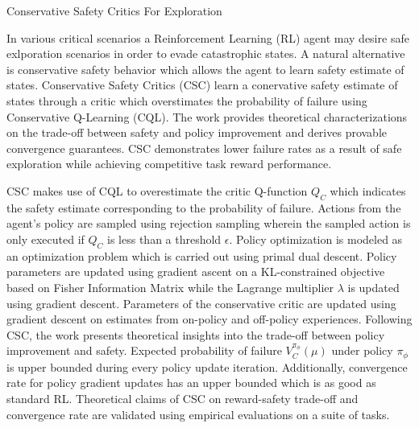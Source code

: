 \documentclass[11pt,letterpaper]{article}
\begin{document}
\begin{center}
  \large{Conservative Safety Critics For Exploration}
\end{center}

In various critical scenarios a Reinforcement Learning (RL) agent may desire safe exlporation scenarios in order to evade catastrophic states. A natural alternative is conservative safety behavior which allows the agent to learn safety estimate of states. Conservative Safety Critics (CSC) learn a conervative safety estimate of states through a critic which overstimates the probability of failure using Conservative Q-Learning (CQL). The work provides theoretical characterizations on the trade-off between safety and policy improvement and derives provable convergence guarantees. CSC demonstrates lower failure rates as a result of safe exploration while achieving competitive task reward performance. 

CSC makes use of CQL to overestimate the critic Q-function $Q_{C}$ which indicates the safety estimate corresponding to the probability of failure. Actions from the agent's policy are sampled using rejection sampling wherein the sampled action is only executed if $Q_{C}$ is less than a threshold $\epsilon$. Policy optimization is modeled as an optimization problem which is carried out using primal dual descent. Policy parameters are updated using gradient ascent on a KL-constrained objective based on Fisher Information Matrix while the Lagrange multiplier $\lambda$ is updated using gradient descent. Parameters of the conservative critic are updated using gradient descent on estimates from on-policy and off-policy experiences. Following CSC, the work presents theoretical insights into the trade-off between policy improvement and safety. Expected probability of failure $V_{C}^{\pi_{\phi}}(\mu)$ under policy $\pi_{\phi}$ is upper bounded during every policy update iteration. Additionally, convergence rate for policy gradient updates has an upper bounded which is as good as standard RL. Theoretical claims of CSC on reward-safety trade-off and convergence rate are validated using empirical evaluations on a suite of tasks. 
\end{document}

